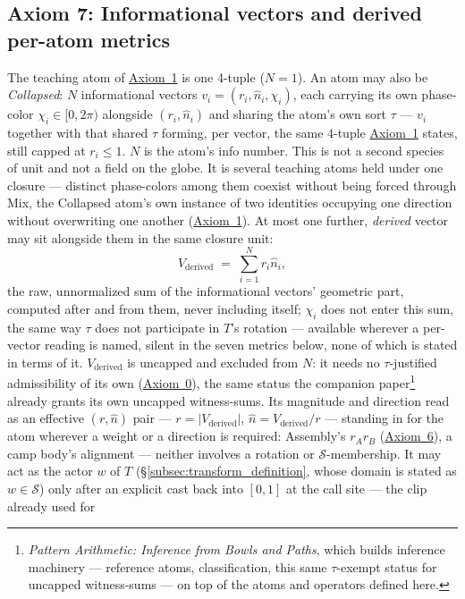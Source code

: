 \documentclass[12pt, a4paper]{article}
\begin{document}
\subsection{Axiom 7: Informational vectors and derived per-atom metrics}
\label{subsec:axiom_v1_metrics}
The teaching atom of \hyperref[subsec:axiom1]{Axiom~1} is one 4-tuple
($N=1$). An atom may also be \emph{Collapsed}: $N$ informational
vectors $v_i=(r_i,\hat n_i,\chi_i)$, each carrying its own
phase-color $\chi_i\in[0,2\pi)$ alongside $(r_i,\hat n_i)$ and
sharing the atom's own sort $\tau$ --- $v_i$ together with that
shared $\tau$ forming, per vector, the same 4-tuple
\hyperref[subsec:axiom1]{Axiom~1} states, still capped at $r_i\le
1$. $N$ is the atom's info
number. This is not a second species of unit and not a field on the
globe. It is several teaching atoms held under one closure ---
distinct phase-colors among them coexist without being forced
through Mix, the Collapsed atom's own instance of two identities occupying
one direction without overwriting one another
(\hyperref[subsec:axiom1]{Axiom~1}). At most one further,
\emph{derived} vector may sit alongside them in the same closure
unit:
\[
V_{\text{derived}} \;=\; \sum_{i=1}^{N} r_i\hat n_i,
\]
the raw, unnormalized sum of the informational vectors' geometric
part, computed after and from them, never including itself; $\chi_i$
does not enter this sum, the same way $\tau$ does not participate in
$T$'s rotation --- available wherever a per-vector reading is named,
silent in the seven metrics below, none of which is stated in terms
of it. $V_{\text{derived}}$ is
uncapped and excluded from $N$: it needs no $\tau$-justified
admissibility of its own (\hyperref[subsec:axiom0_admissibility]{Axiom~0}),
the same status the companion paper\footnote{\emph{Pattern
Arithmetic: Inference from Bowls and Paths}, which builds inference
machinery --- reference atoms, classification, this same
$\tau$-exempt status for uncapped witness-sums --- on top of the
atoms and operators defined here.} already grants its own uncapped
witness-sums. Its magnitude and direction read as an effective
$(r,\hat n)$ pair --- $r=\lvert V_{\text{derived}}\rvert$, $\hat n =
V_{\text{derived}}/r$ --- standing in for the atom wherever a weight
or a direction is required: Assembly's $r_Ar_B$
(\hyperref[subsec:axiom_assembly]{Axiom~6}), a camp body's alignment ---
neither involves a rotation or $\mathcal{S}$-membership. It may act
as the actor $w$ of $T$ (\S\ref{subsec:transform_definition}, whose
domain is stated as $w\in\mathcal{S}$) only after an explicit cast
back into $[0,1]$ at the call site --- the clip already used for
\end{document}
